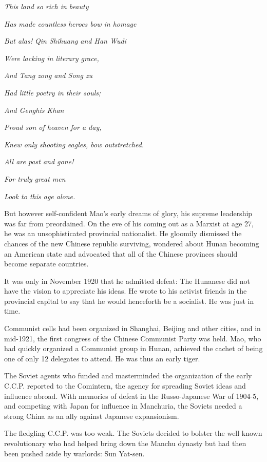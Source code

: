 \emph{This land so rich in beauty}

\emph{Has made countless heroes bow in homage}

\emph{But alas! Qin Shihuang and Han Wudi}

\emph{Were lacking in literary grace,}

\emph{And Tang zong and Song zu}

\emph{Had little poetry in their souls;}

\emph{And Genghis Khan}

\emph{Proud son of heaven for a day,}

\emph{Knew only shooting eagles, bow outstretched.}

\emph{All are past and gone!}

\emph{For truly great men}

\emph{Look to this age alone.}

But however self-confident Mao's early dreams of glory, his supreme
leadership was far from preordained. On the eve of his coming out as a
Marxist at age 27, he was an unsophisticated provincial nationalist. He
gloomily dismissed the chances of the new Chinese republic surviving,
wondered about Hunan becoming an American state and advocated that all
of the Chinese provinces should become separate countries.

It was only in November 1920 that he admitted defeat: The Hunanese did
not have the vision to appreciate his ideas. He wrote to his activist
friends in the provincial capital to say that he would henceforth be a
socialist. He was just in time.

Communist cells had been organized in Shanghai, Beijing and other
cities, and in mid-1921, the first congress of the Chinese Communist
Party was held. Mao, who had quickly organized a Communist group in
Hunan, achieved the cachet of being one of only 12 delegates to attend.
He was thus an early tiger.

The Soviet agents who funded and masterminded the organization of the
early C.C.P. reported to the Comintern, the agency for spreading Soviet
ideas and influence abroad. With memories of defeat in the
Russo-Japanese War of 1904-5, and competing with Japan for influence in
Manchuria, the Soviets needed a strong China as an ally against Japanese
expansionism.

The fledgling C.C.P. was too weak. The Soviets decided to bolster the
well known revolutionary who had helped bring down the Manchu dynasty
but had then been pushed aside by warlords: Sun Yat-sen.

